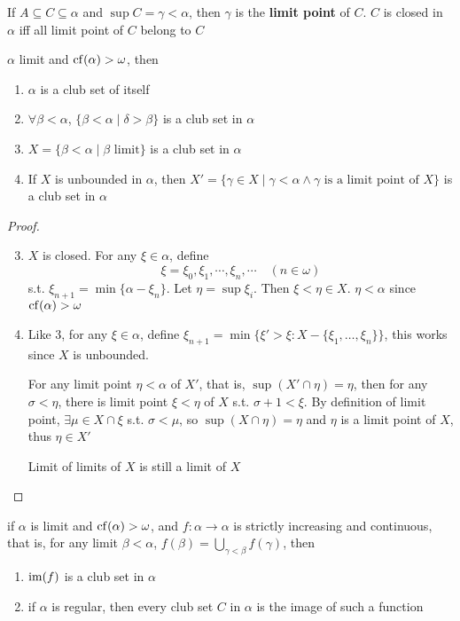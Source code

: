 \documentclass[11pt]{article}
\begin{document}
If \(A\subseteq C\subseteq\alpha\) and \(\sup C=\gamma<\alpha\), then \(\gamma\) is the \textbf{limit point} of \(C\). \(C\) is closed in \(\alpha\) iff
all limit point of \(C\) belong to \(C\)

\begin{lemma}[]
\label{3.3.4}
\(\alpha\) limit and \(\operatorname{cf}(\alpha)>\omega\), then
\begin{enumerate}
\item \(\alpha\) is a club set of itself
\item \(\forall\beta<\alpha\), \(\{\beta<\alpha\mid\delta>\beta\}\) is a club set in \(\alpha\)
\item \(X=\{\beta<\alpha\mid\beta\text{ limit}\}\) is a club set in \(\alpha\)
\item If \(X\) is unbounded in \(\alpha\), then \(X'=\{\gamma\in X\mid\gamma<\alpha\wedge\gamma\text{ is a limit point of }X\}\) is a club
set in \(\alpha\)
\end{enumerate}
\end{lemma}

\begin{proof}
\begin{enumerate}
\setcounter{enumi}{2}
\item \(X\) is closed. For any \(\xi\in\alpha\), define
\begin{equation*}
\xi=\xi_0,\xi_1,\cdots,\xi_n,\cdots\quad(n\in\omega)
\end{equation*}
s.t. \(\xi_{n+1}=\min\{\alpha-\xi_n\}\). Let \(\eta=\sup\xi_i\). Then \(\xi<\eta\in X\). \(\eta<\alpha\) since \(\operatorname{cf}(\alpha)>\omega\)
\item Like 3, for any \(\xi\in\alpha\), define \(\xi_{n+1}=\min\{\xi'>\xi:X-\{\xi_1,\dots,\xi_n\}\}\), this works
since \(X\) is unbounded.

For any limit point \(\eta<\alpha\) of \(X'\), that is, \(\sup(X'\cap\eta)=\eta\), then for any \(\sigma<\eta\), there
is limit point \(\xi<\eta\) of \(X\) s.t. \(\sigma+1<\xi\). By definition of limit point, \(\exists\mu\in X\cap\xi\)
s.t. \(\sigma<\mu\), so \(\sup(X\cap\eta)=\eta\) and \(\eta\) is a limit point of \(X\), thus \(\eta\in X'\)

Limit of limits of \(X\) is still a limit of \(X\)
\end{enumerate}
\end{proof}

\begin{lemma}[]
\label{3.3.5}
if \(\alpha\) is limit and \(\operatorname{cf}(\alpha)>\omega\), and \(f:\alpha\to\alpha\) is strictly increasing and continuous, that is,
for any limit \(\beta<\alpha\), \(f(\beta)=\bigcup_{\gamma<\beta}f(\gamma)\), then
\begin{enumerate}
\item \(\operatorname{im}(f)\) is a club set in \(\alpha\)
\item if \(\alpha\) is regular, then every club set \(C\) in \(\alpha\) is the image of such a function
\end{enumerate}
\end{lemma}
\end{document}
